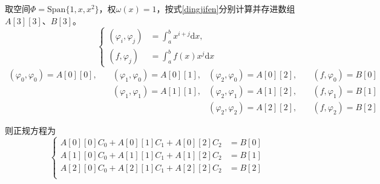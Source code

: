 \documentclass{homework}
\begin{document}
\jie
取空间$\varPhi=\mathrm{Span}\{1,x,x^2\}$，权$\omega(x)=1$，按式\ref{dingjifen}分别计算并存进数组$A[3][3]$、$B[3]$。
\begin{equation}
    \label{dingjifen}
    \left\{
        \begin{aligned}
            (\varphi_i,\varphi_j)&=\int_a^bx^{i+j}\mathrm{d}x,\\
            (f,\varphi_j)&=\int_a^bf(x)x^j\mathrm{d}x
        \end{aligned}
    \right.
\end{equation}
\begin{equation}
    \begin{aligned}
        (\varphi_0,\varphi_0)=A[0][0],\quad&(\varphi_1,\varphi_0)=A[0][1],&(\varphi_2,\varphi_0)=A[0][2],\quad&(f,\varphi_0)=B[0]\\
                            &(\varphi_1,\varphi_1)=A[1][1],&(\varphi_2,\varphi_1)=A[1][2],\quad&(f,\varphi_1)=B[1]\\
                            &&(\varphi_2,\varphi_2)=A[2][2],\quad&(f,\varphi_2)=B[2]
    \end{aligned}
\end{equation}

则正规方程为
\begin{equation}
    \left\{
        \begin{aligned}
            A[0][0]C_0+A[0][1]C_1+A[0][2]C_2&=B[0]\\
            A[1][0]C_0+A[1][1]C_1+A[1][2]C_2&=B[1]\\
            A[2][0]C_0+A[2][1]C_1+A[2][2]C_2&=B[2]\\
        \end{aligned}
    \right.
\end{equation}
\end{document}
